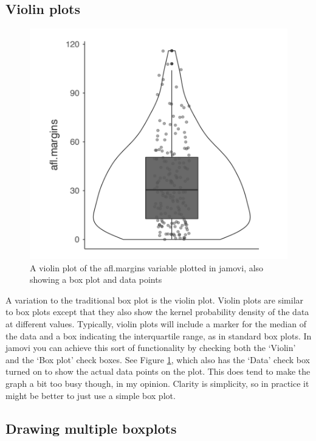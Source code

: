 \documentclass[
]{book}
\begin{document}
\hypertarget{violin-plots}{%
\subsection{Violin plots}\label{violin-plots}}

\begin{figure}
\includegraphics[width=0.9\linewidth]{images/Figure26} \caption{A violin plot of the afl.margins variable plotted in jamovi, also showing a box plot and data points}\label{fig:fig5-5}
\end{figure}

A variation to the traditional box plot is the violin plot. Violin plots are similar to box plots except that they also show the kernel probability density of the data at different values. Typically, violin plots will include a marker for the median of the data and a box indicating the interquartile range, as in standard box plots. In jamovi you can achieve this sort of functionality by checking both the `Violin' and the `Box plot' check boxes. See Figure \ref{fig:fig5-5}, which also has the `Data' check box turned on to show the actual data points on the plot. This does tend to make the graph a bit too busy though, in my opinion. Clarity is simplicity, so in practice it might be better to just use a simple box plot.

\hypertarget{drawing-multiple-boxplots}{%
\subsection{Drawing multiple boxplots}\label{drawing-multiple-boxplots}}
\end{document}
